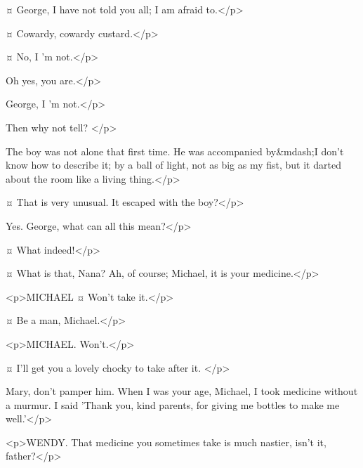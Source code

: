 
\mrsdarlingspeaks {}¤
George, I have not told you all; I am afraid to.</p>

\mrdarlingspeaks {}¤
Cowardy, cowardy custard.</p>

\mrsdarlingspeaks {}¤
No, I 'm not.</p>

\mrdarlingspeaks
Oh yes, you are.</p>

\mrsdarlingspeaks
George, I 'm not.</p>

\mrdarlingspeaks
Then why not tell?
</p>

\mrsdarlingspeaks
The boy was not alone that first time. He was accompanied by&mdash;I don't know how to describe it; by a ball of light, not as big as my fist, but it darted about the room like a living thing.</p>

\mrdarlingspeaks {}¤
That is very unusual. It escaped with the boy?</p>

\mrsdarlingspeaks
Yes.
George, what can all this mean?</p>

\mrdarlingspeaks {}¤
What indeed!</p>


\mrsdarlingspeaks {}¤
What is that, Nana? Ah, of course; Michael, it is your medicine.</p>

<p>MICHAEL ¤
Won't take it.</p>

\mrdarlingspeaks {}¤
Be a man, Michael.</p>

<p>MICHAEL. Won't.</p>

\mrsdarlingspeaks {}¤
I'll get you a lovely chocky to take after it.
</p>

\mrdarlingspeaks
Mary, don't pamper him. When I was your age, Michael, I took medicine without a murmur. I said 'Thank you, kind parents, for giving me bottles to make me well.'</p>


<p>WENDY. That medicine you sometimes take is much nastier, isn't it, father?</p>


